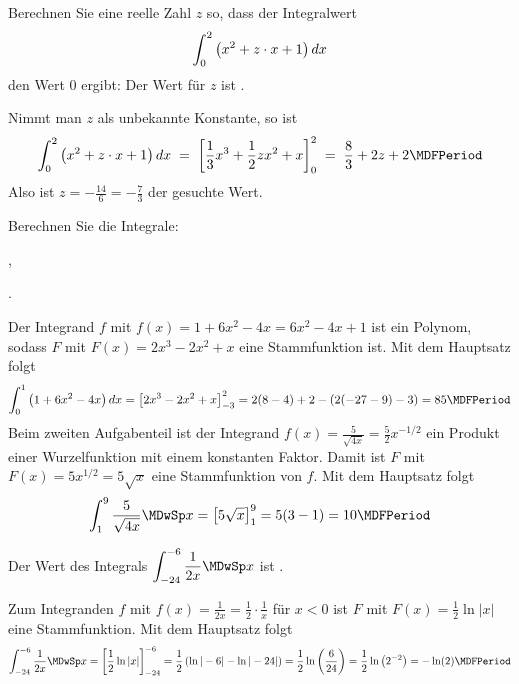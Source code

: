 \begin{MExercises}
\begin{MExercise}
Berechnen Sie eine reelle Zahl $z$ so, dass der Integralwert
\[
\int_{0}^{2} \left(x^2 + z\cdot x+1\right) \MD x %
\]
den Wert $0$ ergibt: %
Der Wert für $z$ 
ist .

\begin{MHint}{\iSolution}
Nimmt man $z$ als unbekannte Konstante, so ist
$$
\int_{0}^{2} \left(x^2 + z\cdot x+1\right) \MD x %
\;=\; \left[{\frac13x^3+\frac12 z x^2+x}\right]_0^2 %
\;=\; \frac83+2z+2 \MDFPeriod %
$$
Also ist $z=-\frac{14}{6} = -\frac{7}{3}$ der gesuchte Wert.
\end{MHint}
\end{MExercise}

\begin{MExercise}
Berechnen Sie die Integrale:
\begin{MExerciseItems}
\item{,}
\item{.}
\end{MExerciseItems}

\begin{MHint}{\iSolution}
Der Integrand $f$ mit $f(x) = 1 + 6 x^2 - 4x = 6 x^2 - 4 x + 1$ ist ein Polynom,
sodass $F$ mit $F(x) = 2 x^3 - 2 x^2 + x$ eine Stammfunktion ist. Mit dem 
Hauptsatz folgt
\[
 \int_{0}^{1} \left(1 + 6 x^2 - 4 x\right) \MD x %
 = \left[ 2 x^3 - 2 x^2 + x \right]_{-3}^{2} %
 = 2 (8 - 4) + 2 - (2 (-27 - 9) - 3) = 85 \MDFPeriod %
\]
Beim zweiten Aufgabenteil ist
der Integrand $f(x) = \frac{5}{\sqrt{4 x}}= \frac{5}{2} x^{-1/2}$ ein 
Produkt einer Wurzelfunktion mit einem konstanten Faktor. Damit ist $F$ mit
$F(x) = 5 x^{1/2} = 5 \sqrt{x}$ eine Stammfunktion von $f$. Mit dem Hauptsatz 
folgt
\[
 \int_{1}^{9} \frac{5}{\sqrt{4 x}} \MDwSp x %
 = \left[ 5 \sqrt{x} \right]_{1}^{9} %
 = 5 (3 - 1) = 10 \MDFPeriod %
\]
\end{MHint}
\end{MExercise}

\begin{MExercise}
Der Wert des Integrals
$\displaystyle \int_{-24}^{-6} \frac{1}{2 x} \MDwSp x$
ist .

\begin{MHint}{\iSolution}
Zum Integranden $f$ mit $f(x) = \frac{1}{2 x} = \frac{1}{2} \cdot \frac{1}{x}$ 
für $x < 0$ ist $F$ mit $F(x) = \frac{1}{2} \ln|x|$ eine Stammfunktion.
Mit dem Hauptsatz folgt
\[
 \int_{-24}^{-6} \frac{1}{2 x} \MDwSp x %
 = \left[ \frac{1}{2} \ln|x| \right]_{-24}^{-6} %
 = \frac{1}{2} \left(\ln|-6| - \ln|-24|\right) %
 = \frac{1}{2} \ln\left(\frac{6}{24}\right) %
 = \frac{1}{2} \ln\left(2^{-2}\right) %
 = -\ln(2) \MDFPeriod %
\]
\end{MHint}
\end{MExercise}


\end{MExercises}

